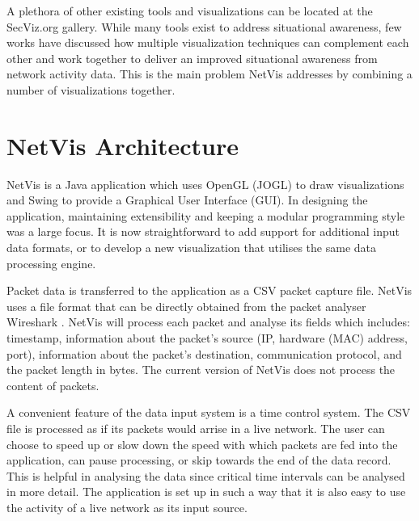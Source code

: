 A plethora of other existing tools and visualizations can be located at the SecViz.org gallery.
While many tools exist to address situational awareness, few works have discussed how multiple
visualization techniques can complement each other and work together to deliver an improved
situational awareness from network activity data. This is the main problem NetVis addresses by
combining a number of visualizations together. 

\section{NetVis Architecture}\label{sec:overview}
%
NetVis is a Java application which uses OpenGL (JOGL) to draw visualizations and Swing to provide a
Graphical User Interface (GUI). In designing the application, maintaining extensibility and keeping
a modular programming style was a large focus. It is now straightforward to add support for
additional input data formats, or to develop a new visualization that utilises the same data
processing engine.

Packet data is transferred to the application as a CSV packet capture file. NetVis uses a file
format that can be directly obtained from the packet analyser Wireshark \cite{wireshark}. NetVis
will process each packet and analyse its fields which includes: timestamp, information about the
packet's source (IP, hardware (MAC) address, port), information about the packet's destination,
communication protocol, and the packet length in bytes. The current version of NetVis does not
process the content of packets. 


A convenient feature of the data input system is a time control system. The CSV file is processed as
if its packets would arrise in a live network. The user can choose to speed up or slow down the
speed with which packets are fed into the application, can pause processing, or skip towards the end
of the data record. This is helpful in analysing the data since critical time intervals can be
analysed in more detail. The application is set up in such a way that it is also easy to use the
activity of a live network as its input source. 

